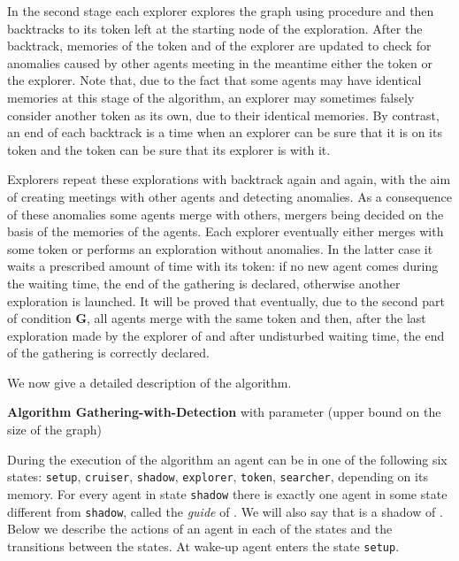 \documentclass[11pt]{article}
\begin{document}
 In the second stage each explorer explores the graph using procedure  and then backtracks to its token
 left at the starting node of the exploration. After the backtrack, memories of the token and of the explorer are updated to check for anomalies caused by other agents
 meeting in the meantime either the token or the explorer. Note that, due to the fact that some agents may have identical memories at this stage of the algorithm, 
 an explorer may sometimes falsely consider another token as its own, due to their identical memories. By contrast, an end of each
 backtrack is a time when an explorer can be sure that it is on its token and the token can be sure that its explorer is with it.  
 
 Explorers repeat these explorations with backtrack again and again, with the aim of creating meetings with other agents and detecting anomalies.
 As a consequence of these anomalies some agents merge with others, mergers being decided on the basis of the memories of the agents.
Each explorer eventually either merges with some token or performs an exploration without anomalies. In the latter case it waits a prescribed amount of time with its token: if
no new agent comes during the waiting time, the end of the gathering is declared, otherwise another exploration is launched. It will be proved that eventually, due to the second part of condition {\bf G}, all agents merge with the same
token  and then, after the last exploration made by the explorer  of  and after undisturbed waiting time, the end of the gathering is correctly declared.
 
  
 We now give a detailed description of the algorithm.
 
 \vspace*{0.3cm}
 
 \noindent
 {\bf Algorithm Gathering-with-Detection} with parameter  (upper bound on the size of the graph)
 
  \vspace*{0.2cm}
 
 During the execution of the algorithm an agent can be in one of the following six states: {\tt setup},  {\tt cruiser}, {\tt shadow}, {\tt explorer},  {\tt token}, {\tt searcher},
 depending on its memory.
 For every agent  in state  {\tt shadow} there is exactly one agent  in some state different from  {\tt shadow}, called the {\em guide} of . We will also
 say that  is a shadow of .
 Below we describe the actions of an agent  in each of the states and the transitions between the states. At wake-up agent  enters the state  {\tt setup}.
 
\end{document}
